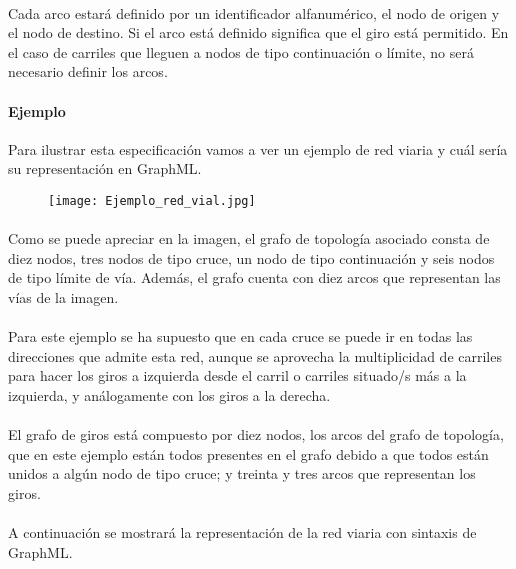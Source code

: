 	\paragraph{}
	Cada arco estará definido por un identificador alfanumérico, el nodo de origen y el nodo de destino. Si el arco está definido significa que el giro está permitido. En el caso de carriles que lleguen a nodos de tipo continuación o límite, no será necesario definir los arcos.
	
	\paragraph{Ejemplo}
	Para ilustrar esta especificación vamos a ver un ejemplo de red viaria y cuál sería su representación en GraphML.
	
	\begin{figure}[H]
		\centering
			\texttt{[image: Ejemplo\_red\_vial.jpg]}
	\end{figure}
	
	\paragraph{}
	Como se puede apreciar en la imagen, el grafo de topología asociado consta de diez nodos, tres nodos de tipo cruce, un nodo de tipo continuación y seis nodos de tipo límite de vía. Además, el grafo cuenta con diez arcos que representan las vías de la imagen.
	
	\paragraph{}
	Para este ejemplo se ha supuesto que en cada cruce se puede ir en todas las direcciones que admite esta red, aunque se aprovecha la multiplicidad de carriles para hacer los giros a izquierda desde el carril o carriles situado/s más a la izquierda, y análogamente con los giros a la derecha.
	
	\paragraph{}
	El grafo de giros está compuesto por diez nodos, los arcos del grafo de topología, que en este ejemplo están todos presentes en el grafo debido a que todos están unidos a algún nodo de tipo cruce; y treinta y tres arcos que representan los giros.
	
	\paragraph{}
	A continuación se mostrará la representación de la red viaria con sintaxis de GraphML.
	

